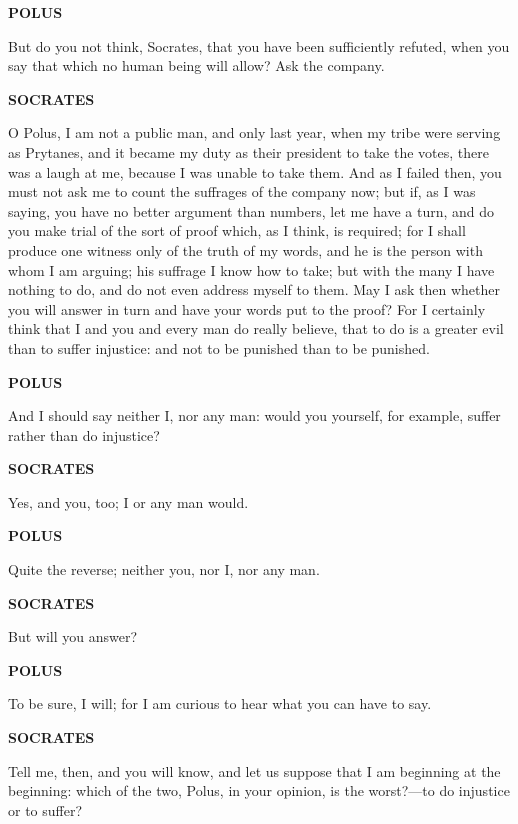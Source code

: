 \documentclass[11pt,letter]{article}
\begin{document}
\par \textbf{POLUS}
\par   But do you not think, Socrates, that you have been sufficiently refuted, when you say that which no human being will allow? Ask the company.

\par \textbf{SOCRATES}
\par   O Polus, I am not a public man, and only last year, when my tribe were serving as Prytanes, and it became my duty as their president to take the votes, there was a laugh at me, because I was unable to take them. And as I failed then, you must not ask me to count the suffrages of the company now; but if, as I was saying, you have no better argument than numbers, let me have a turn, and do you make trial of the sort of proof which, as I think, is required; for I shall produce one witness only of the truth of my words, and he is the person with whom I am arguing; his suffrage I know how to take; but with the many I have nothing to do, and do not even address myself to them. May I ask then whether you will answer in turn and have your words put to the proof? For I certainly think that I and you and every man do really believe, that to do is a greater evil than to suffer injustice:  and not to be punished than to be punished.

\par \textbf{POLUS}
\par   And I should say neither I, nor any man:  would you yourself, for example, suffer rather than do injustice?

\par \textbf{SOCRATES}
\par   Yes, and you, too; I or any man would.

\par \textbf{POLUS}
\par   Quite the reverse; neither you, nor I, nor any man.

\par \textbf{SOCRATES}
\par   But will you answer?

\par \textbf{POLUS}
\par   To be sure, I will; for I am curious to hear what you can have to say.

\par \textbf{SOCRATES}
\par   Tell me, then, and you will know, and let us suppose that I am beginning at the beginning:  which of the two, Polus, in your opinion, is the worst?—to do injustice or to suffer?
\end{document}
